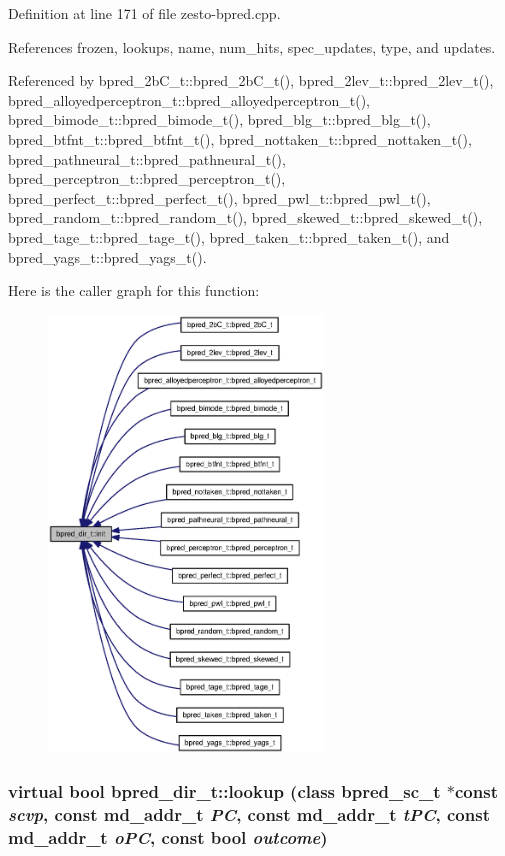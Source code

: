 Definition at line 171 of file zesto-bpred.cpp.

References frozen, lookups, name, num\_\-hits, spec\_\-updates, type, and updates.

Referenced by bpred\_\-2bC\_\-t::bpred\_\-2bC\_\-t(), bpred\_\-2lev\_\-t::bpred\_\-2lev\_\-t(), bpred\_\-alloyedperceptron\_\-t::bpred\_\-alloyedperceptron\_\-t(), bpred\_\-bimode\_\-t::bpred\_\-bimode\_\-t(), bpred\_\-blg\_\-t::bpred\_\-blg\_\-t(), bpred\_\-btfnt\_\-t::bpred\_\-btfnt\_\-t(), bpred\_\-nottaken\_\-t::bpred\_\-nottaken\_\-t(), bpred\_\-pathneural\_\-t::bpred\_\-pathneural\_\-t(), bpred\_\-perceptron\_\-t::bpred\_\-perceptron\_\-t(), bpred\_\-perfect\_\-t::bpred\_\-perfect\_\-t(), bpred\_\-pwl\_\-t::bpred\_\-pwl\_\-t(), bpred\_\-random\_\-t::bpred\_\-random\_\-t(), bpred\_\-skewed\_\-t::bpred\_\-skewed\_\-t(), bpred\_\-tage\_\-t::bpred\_\-tage\_\-t(), bpred\_\-taken\_\-t::bpred\_\-taken\_\-t(), and bpred\_\-yags\_\-t::bpred\_\-yags\_\-t().

Here is the caller graph for this function:\nopagebreak
\begin{figure}[H]
\begin{center}
\leavevmode
\includegraphics[width=207pt]{classbpred__dir__t_d705e0919d6c44fbecbb22d0cb9b4472_icgraph}
\end{center}
\end{figure}
\subsubsection[{lookup}]{\setlength{\rightskip}{0pt plus 5cm}virtual bool bpred\_\-dir\_\-t::lookup (class {\bf bpred\_\-sc\_\-t} $\ast$const  {\em scvp}, \/  const {\bf md\_\-addr\_\-t} {\em PC}, \/  const {\bf md\_\-addr\_\-t} {\em tPC}, \/  const {\bf md\_\-addr\_\-t} {\em oPC}, \/  const bool {\em outcome})\hspace{0.3cm}{\tt  [pure virtual]}}\label{classbpred__dir__t_dba28e61c7848e2fd5b9e66a6a1436c4}





